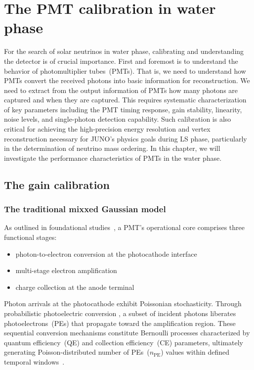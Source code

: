 \chapter{The PMT calibration in water phase}\label{sec:Introduction}
For the search of solar neutrinos in water phase, calibrating and understanding the detector is of crucial importance. First and foremost is to understand the behavior of photomultiplier tubes~(PMTs). That is, we need to understand how PMTs convert the received photons into basic information for reconstruction. We need to extract from the output information of PMTs how many photons are captured and when they are captured. This requires systematic characterization of key parameters including the PMT timing response, gain stability, linearity, noise levels, and single-photon detection capability. Such calibration is also critical for achieving the high-precision energy resolution and vertex reconstruction necessary for JUNO's physics goals during LS phase, particularly in the determination of neutrino mass ordering. In this chapter, we will investigate the performance characteristics of PMTs in the water phase.
\section{The gain calibration}
\subsection{The traditional mixxed Gaussian model}
As outlined in foundational studies~\cite{1955Scintillation}, a PMT's operational core comprises three functional stages:
\begin{itemize}
	\item photon-to-electron conversion at the photocathode interface
	\item multi-stage electron amplification
	\item charge collection at the anode terminal
\end{itemize}

Photon arrivals at the photocathode exhibit Poissonian stochasticity. Through probabilistic photoelectric conversion \cite{2016Optimization}, a subset of incident photons liberates photoelectrons~(PEs) that propagate toward the amplification region. These sequential conversion mechanisms constitute Bernoulli processes characterized by quantum efficiency~(QE) and collection efficiency~(CE) parameters, ultimately generating Poisson-distributed number of PEs~($n_{\mathrm{PE}}$) values within defined temporal windows~\cite{1994Absolute}.

